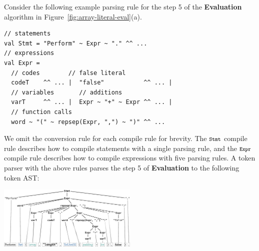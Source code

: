 Consider the following example parsing rule for the step 5 of the
\textbf{Evaluation} algorithm in Figure~\ref{fig:array-literal-eval}(a).
\begin{lstlisting}[style=myScalastyle]
// statements
val Stmt = "Perform" ~ Expr ~ "." ^^ ...
// expressions
val Expr =
  // codes        // false literal
  codeT    ^^ ... |  "false"           ^^ ... |
  // variables       // additions
  varT     ^^ ... |  Expr ~ "+" ~ Expr ^^ ... |
  // function calls
  word ~ "(" ~ repsep(Expr, ",") ~ ")" ^^ ...
\end{lstlisting}
We omit the conversion rule for each compile rule for brevity.  The \(
\texttt{\footnotesize Stmt} \) compile rule  describes how to compile statements with a single
parsing rule, and the \( \texttt{\footnotesize Expr} \) compile rule describes how to compile
expressions with five parsing rules.  A token parser with the above rules parses
the step 5 of \textbf{Evaluation} to the following token AST:
\begin{center}
  \includegraphics[width=0.5\textwidth]{img/token-ast}
\end{center}


